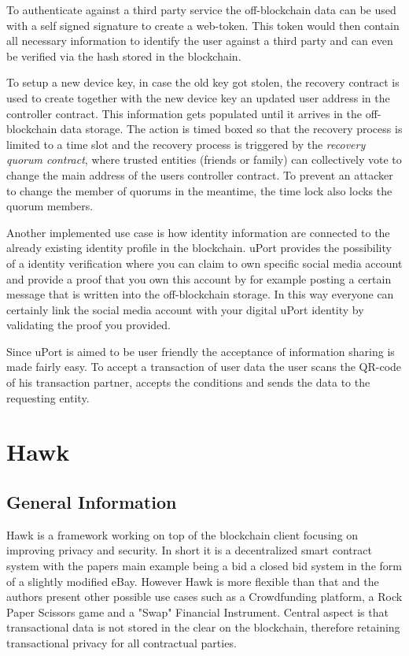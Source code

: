 To authenticate against a third party service the off-blockchain data can be used with a self signed signature to create a web-token. This token would then contain all necessary information to identify the user against a third party and can even be verified via the hash stored in the blockchain.

To setup a new device key, in case the old key got stolen, the recovery contract is used to create together with the new device key an updated user address in the controller contract. This information gets populated until it arrives in the off-blockchain data storage. The action is timed boxed so that the recovery process is limited to a time slot and the recovery process is triggered by the \textit{recovery quorum contract}, where trusted entities (friends or family) can collectively vote to change the main address of the users controller contract. To prevent an attacker to change the member of quorums in the meantime, the time lock also locks the quorum members.

Another implemented use case is how identity information are connected to the already existing identity profile in the blockchain. uPort provides the possibility of a identity verification where you can claim to own specific social media account and provide a proof that you own this account by  for example posting a certain message that is written into the off-blockchain storage. In this way everyone can certainly link the social media account with your digital uPort identity by validating the proof you provided.

Since uPort is aimed to be user friendly the acceptance of information sharing is made fairly easy. To accept a transaction of user data the user scans the QR-code of his transaction partner, accepts the conditions and sends the data to the requesting entity.

\section{Hawk}
\subsection{General Information}
Hawk is a framework working on top of the blockchain client focusing on improving privacy and security. In short it is a decentralized smart contract system with the papers main example being a bid a closed bid system in the form of a slightly modified eBay.\cite[p.840]{Hawk} However Hawk is more flexible than that and the authors present other possible use cases such as a Crowdfunding platform, a Rock Paper Scissors game and a "Swap" Financial Instrument.\cite[p.852]{Hawk} Central aspect is that transactional data is not stored in the clear on the blockchain, therefore retaining transactional privacy for all contractual parties.\cite[p.840]{Hawk}

